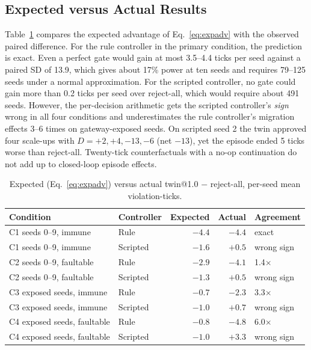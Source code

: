 \documentclass[conference]{IEEEtran}
\begin{document}
\subsection{Expected versus Actual Results}

Table~\ref{tab:expected} compares the expected advantage of Eq.~\eqref{eq:expadv} with the observed paired difference. For the rule controller in the primary condition, the prediction is exact. Even a perfect gate would gain at most 3.5--4.4 ticks per seed against a paired SD of 13.9, which gives about 17\% power at ten seeds and requires 79--125 seeds under a normal approximation. For the scripted controller, no gate could gain more than 0.2 ticks per seed over reject-all, which would require about 491 seeds. However, the per-decision arithmetic gets the scripted controller's \emph{sign} wrong in all four conditions and underestimates the rule controller's migration effects 3--6 times on gateway-exposed seeds. On scripted seed 2 the twin approved four scale-ups with $D = +2, +4, -13, -6$ (net $-13$), yet the episode ended 5 ticks worse than reject-all. Twenty-tick counterfactuals with a no-op continuation do not add up to closed-loop episode effects.

\begin{table}[t]
\centering
\caption{Expected (Eq.~\eqref{eq:expadv}) versus actual twin@1.0 $-$ reject-all, per-seed mean violation-ticks.}
\label{tab:expected}
\footnotesize
\setlength{\tabcolsep}{3pt}
\begin{tabular}{@{}llrrl@{}}
\toprule
Condition & Controller & Expected & Actual & Agreement \\
\midrule
C1 seeds 0--9, immune       & Rule     & $-4.4$ & $-4.4$ & exact \\
C1 seeds 0--9, immune       & Scripted & $-1.6$ & $+0.5$ & wrong sign \\
C2 seeds 0--9, faultable    & Rule     & $-2.9$ & $-4.1$ & 1.4$\times$ \\
C2 seeds 0--9, faultable    & Scripted & $-1.3$ & $+0.5$ & wrong sign \\
C3 exposed seeds, immune    & Rule     & $-0.7$ & $-2.3$ & 3.3$\times$ \\
C3 exposed seeds, immune    & Scripted & $-1.0$ & $+0.7$ & wrong sign \\
C4 exposed seeds, faultable & Rule     & $-0.8$ & $-4.8$ & 6.0$\times$ \\
C4 exposed seeds, faultable & Scripted & $-1.0$ & $+3.3$ & wrong sign \\
\bottomrule
\end{tabular}
\end{table}
\end{document}
